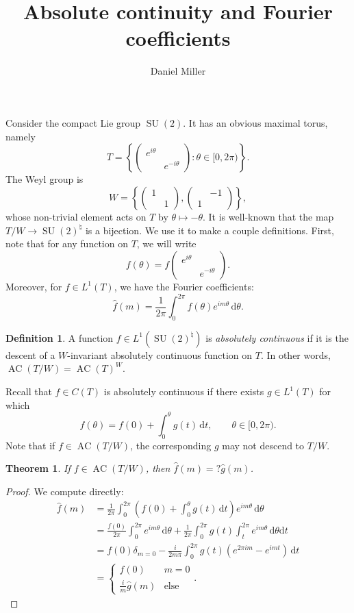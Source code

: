 \documentclass{article}
\title{Absolute continuity and Fourier coefficients}
\author{Daniel Miller}
\DeclareMathOperator{\AC}{AC}
\DeclareMathOperator{\SU}{SU}
\newcommand{\dd}{\mathrm{d}}
\newtheorem{theorem}{Theorem}
\theoremstyle{definition}
\newtheorem{definition}{Definition}
\begin{document}
\maketitle





Consider the compact Lie group $\SU(2)$. It has an obvious maximal torus, 
namely 
\[
	T = \left\{\begin{pmatrix} e^{i\theta} \\ & e^{-i\theta}\end{pmatrix} : \theta\in [0,2\pi)\right\} .
\]
The Weyl group is 
\[
	W = \left\{\begin{pmatrix} 1 \\ & 1 \end{pmatrix}, \begin{pmatrix} & -1 \\ 1 \end{pmatrix}\right\} ,
\]
whose non-trivial element acts on $T$ by $\theta\mapsto -\theta$. It is 
well-known that the map $T/W \to \SU(2)^\natural$ is a bijection. We use it to 
make a couple definitions. First, note that for any function on $T$, we will 
write 
\[
	f(\theta) = f\begin{pmatrix} e^{i\theta} \\ & e^{-i\theta} \end{pmatrix} .
\]
Moreover, for $f\in L^1(T)$, we have the Fourier coefficients:
\[
	\widehat f(m) = \frac{1}{2\pi} \int_0^{2\pi} f(\theta) e^{i m \theta}\, \dd \theta .
\]

\begin{definition}
A function $f\in L^1(\SU(2)^\natural)$ is \emph{absolutely continuous} if it is 
the descent of a $W$-invariant absolutely continuous function on $T$. In 
other words, $\AC(T/W) = \AC(T)^W$. 
\end{definition}

Recall that $f\in C(T)$ is absolutely continuous if there exists $g\in L^1(T)$ 
for which 
\[
	f(\theta) = f(0) + \int_0^\theta g(t)\, \dd t, \qquad \theta\in [0,2\pi) .
\]
Note that if $f\in \AC(T/W)$, the corresponding $g$ may not descend to 
$T/W$. 

\begin{theorem}
If $f\in \AC(T/W)$, then $\widehat f(m) = ? \widehat g(m)$. 
\end{theorem}
\begin{proof}
We compute directly:
\begin{align*}
	\widehat f(m) 
		&= \frac{1}{2\pi} \int_0^{2\pi} \left(f(0) + \int_0^\theta g(t)\, \dd t\right) e^{i m \theta}\, \dd \theta \\
		&= \frac{f(0)}{2\pi} \int_0^{2\pi} e^{i m \theta}\, \dd\theta + \frac{1}{2\pi} \int_0^{2\pi} g(t)\int_t^{2\pi} e^{i m \theta} \,\dd\theta\dd t \\
		&= f(0) \delta_{m=0} -\frac{i}{2m\pi} \int_0^{2\pi} g(t) (e^{2\pi i m} - e^{i m t})\, \dd t \\
		&= \begin{cases} f(0) & m=0 \\ \frac{i}{m} \widehat g(m) & \text{else} \end{cases} .
\end{align*}
\end{proof}
\end{document}
